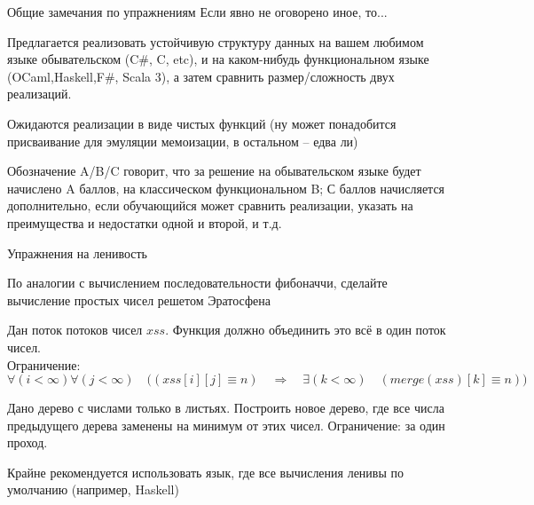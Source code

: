\newcommand\exscore[3]{#1/#2/#3}


\begin{frame}{Общие замечания по упражнениям}
Если явно не оговорено иное, то...
\vspace{3em}

Предлагается реализовать устойчивую структуру данных на вашем любимом языке обывательском (C\#, C, etc), и на каком-нибудь функциональном языке (OCaml,Haskell,F\#, Scala 3), а затем сравнить размер/сложность двух реализаций.

Ожидаются реализации в виде чистых функций (ну может понадобится присваивание для эмуляции мемоизации, в остальном -- едва ли)
\vspace{2em}

Обозначение \exscore{A}{B}{C} говорит, что за решение на обывательском языке будет начислено A баллов, на классическом функциональном B; С баллов начисляется дополнительно, если обучающийся может сравнить реализации, указать на преимущества и недостатки одной и второй, и т.д.
\end{frame}



\begin{frame}[allowframebreaks]{Упражнения на ленивость}
\begin{exercise}[\exscore{?}{?}{?}]
По аналогии с вычислением последовательности фибоначчи, сделайте вычисление простых чисел решетом Эратосфена
\end{exercise}
\begin{exercise}[\exscore{?}{?}{?}]
Дан поток потоков чисел $xss$. Функция  должно объединить это всё в один поток чисел. \\
Ограничение: $\forall (i<\infty) \forall (j<\infty)\quad \big((xss[i][j]\equiv n)\quad \Longrightarrow \quad\exists (k<\infty)\quad (merge(xss)[k]\equiv n)\big)$
\end{exercise}

\begin{exercise}[\exscore{?}{?}{?}]
Дано дерево с числами только в листьях. Построить новое дерево, где все числа предыдущего дерева заменены на минимум от этих чисел. Ограничение: за один проход.
\begin{remark}
Крайне рекомендуется использовать язык, где все вычисления ленивы по умолчанию (например, Haskell)
\end{remark}
\end{exercise}
\end{frame}



